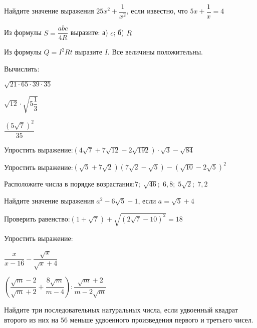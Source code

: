 \begin{listofex}
	\item {}
	\item {}
	\item Найдите значение выражения \( 25x^2+\dfrac{1}{x^2} \), если известно, что \( 5x+\dfrac{1}{x}=4 \)
	\item Из формулы \( S=\dfrac{abc}{4R} \) выразите: а) \( c \); б) \( R \)
	\item Из формулы \( Q=I^2Rt \) выразите \( I \). Все величины положительны.
	
	\item Вычислить:
	\begin{enumcols}[itemcolumns=3]
		\item \( \sqrt{21\cdot65\cdot39\cdot35} \)
		\item \( \sqrt{12}\cdot\sqrt{5\dfrac{1}{3}} \)
		\item \( \dfrac{(5\sqrt{7})^2}{35} \)
	\end{enumcols}
	\item Упростить выражение:\quad\( (4\sqrt{7}+7\sqrt{12}-2\sqrt{192})\cdot\sqrt{3}-\sqrt{84} \)
	\item Упростить выражение:\quad\( (\sqrt{5}+7\sqrt{2})(7\sqrt{2}-\sqrt{5})-(\sqrt{10}-2\sqrt{5})^2 \)
	\item Расположите числа в порядке возрастания:\quad\( 7;\;\sqrt{46};\;6,8;\;5\sqrt{2};\;7,2 \)
	\item Найдите значение выражения \( a^2-6\sqrt{5}-1 \), если \( a=\sqrt{5}+4 \)
	\item Проверить равенство:\quad\( (1+\sqrt{7})+\sqrt{(2\sqrt{7}-10)^2}=18 \)
	
	\item Упростить выражение:
	\begin{enumcols}[itemcolumns=2]
		\item \( \dfrac{x}{x-16}-\dfrac{\sqrt{x}}{\sqrt{x}+4} \)
		\item \( \left( \dfrac{\sqrt{m}-2}{\sqrt{m}+2}+\dfrac{8\sqrt{m}}{m-4} \right):\dfrac{\sqrt{m}+2}{m-2\sqrt{m}} \)
	\end{enumcols}
	\item Найдите три последовательных натуральных числа, если удвоенный квадрат второго из них на \( 56 \) меньше удвоенного произведения первого и третьего чисел.
\end{listofex}